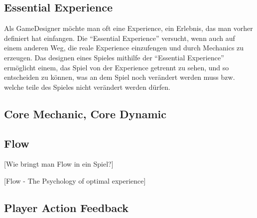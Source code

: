 \subsection{Essential Experience}

Als GameDesigner möchte man oft eine Experience, ein Erlebnis, das man vorher definiert hat einfangen. Die "`Essential Experience"' versucht, wenn auch auf einem anderen Weg, die reale Experience einzufengen und durch Mechanics zu erzeugen. Das designen eines Spieles mithilfe der "`Essential Experience"' ermöglicht einem, das Spiel von der Experience getrennt zu sehen, und so entscheiden zu können, was an dem Spiel noch verändert werden muss bzw. welche teile des Spieles nicht verändert werden dürfen. \cite[S.55]{_art_of_gamedesign}

\subsection{Core Mechanic, Core Dynamic}



\subsection{Flow}

[Wie bringt man Flow in ein Spiel?]

\cite{_theory_of_fun}

[Flow - The Psychology of optimal experience]

\subsection{Player Action Feedback}

